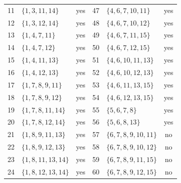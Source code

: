 \documentclass[aps,pra,reprint,superscriptaddress,longbibliography,nofootinbib,floatfix,10pt]{revtex4-2}
\theoremstyle{definition}
\begin{document}
\begin{longtable}{rlc@{\qquad}rlc}
11 & $\{1,\allowbreak 3,\allowbreak 11,\allowbreak 14\}$ & yes & 47 & $\{4,\allowbreak 6,\allowbreak 7,\allowbreak 10,\allowbreak 11\}$ & yes\\
12 & $\{1,\allowbreak 3,\allowbreak 12,\allowbreak 14\}$ & yes & 48 & $\{4,\allowbreak 6,\allowbreak 7,\allowbreak 10,\allowbreak 12\}$ & yes\\
13 & $\{1,\allowbreak 4,\allowbreak 7,\allowbreak 11\}$ & yes & 49 & $\{4,\allowbreak 6,\allowbreak 7,\allowbreak 11,\allowbreak 15\}$ & yes\\
14 & $\{1,\allowbreak 4,\allowbreak 7,\allowbreak 12\}$ & yes & 50 & $\{4,\allowbreak 6,\allowbreak 7,\allowbreak 12,\allowbreak 15\}$ & yes\\
15 & $\{1,\allowbreak 4,\allowbreak 11,\allowbreak 13\}$ & yes & 51 & $\{4,\allowbreak 6,\allowbreak 10,\allowbreak 11,\allowbreak 13\}$ & yes\\
16 & $\{1,\allowbreak 4,\allowbreak 12,\allowbreak 13\}$ & yes & 52 & $\{4,\allowbreak 6,\allowbreak 10,\allowbreak 12,\allowbreak 13\}$ & yes\\
17 & $\{1,\allowbreak 7,\allowbreak 8,\allowbreak 9,\allowbreak 11\}$ & yes & 53 & $\{4,\allowbreak 6,\allowbreak 11,\allowbreak 13,\allowbreak 15\}$ & yes\\
18 & $\{1,\allowbreak 7,\allowbreak 8,\allowbreak 9,\allowbreak 12\}$ & yes & 54 & $\{4,\allowbreak 6,\allowbreak 12,\allowbreak 13,\allowbreak 15\}$ & yes\\
19 & $\{1,\allowbreak 7,\allowbreak 8,\allowbreak 11,\allowbreak 14\}$ & yes & 55 & $\{5,\allowbreak 6,\allowbreak 7,\allowbreak 8\}$ & yes\\
20 & $\{1,\allowbreak 7,\allowbreak 8,\allowbreak 12,\allowbreak 14\}$ & yes & 56 & $\{5,\allowbreak 6,\allowbreak 8,\allowbreak 13\}$ & yes\\
21 & $\{1,\allowbreak 8,\allowbreak 9,\allowbreak 11,\allowbreak 13\}$ & yes & 57 & $\{6,\allowbreak 7,\allowbreak 8,\allowbreak 9,\allowbreak 10,\allowbreak 11\}$ & no\\
22 & $\{1,\allowbreak 8,\allowbreak 9,\allowbreak 12,\allowbreak 13\}$ & yes & 58 & $\{6,\allowbreak 7,\allowbreak 8,\allowbreak 9,\allowbreak 10,\allowbreak 12\}$ & no\\
23 & $\{1,\allowbreak 8,\allowbreak 11,\allowbreak 13,\allowbreak 14\}$ & yes & 59 & $\{6,\allowbreak 7,\allowbreak 8,\allowbreak 9,\allowbreak 11,\allowbreak 15\}$ & no\\
24 & $\{1,\allowbreak 8,\allowbreak 12,\allowbreak 13,\allowbreak 14\}$ & yes & 60 & $\{6,\allowbreak 7,\allowbreak 8,\allowbreak 9,\allowbreak 12,\allowbreak 15\}$ & no\\

\end{longtable}
\end{document}
